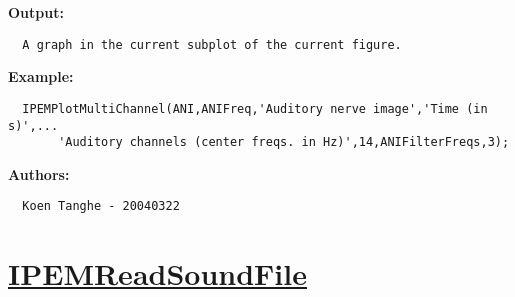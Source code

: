 \textbf{Output:}
\begin{verbatim}  A graph in the current subplot of the current figure.

\end{verbatim}
\textbf{Example:}
\begin{verbatim}  IPEMPlotMultiChannel(ANI,ANIFreq,'Auditory nerve image','Time (in s)',...
       'Auditory channels (center freqs. in Hz)',14,ANIFilterFreqs,3);

\end{verbatim}
\textbf{Authors:}
\begin{verbatim}  Koen Tanghe - 20040322
\end{verbatim}


\newpage
\section*{\hyperlink{Concepts:IPEMReadSoundFile}{IPEMReadSoundFile}}
\hypertarget{FuncRef:IPEMReadSoundFile}{}

